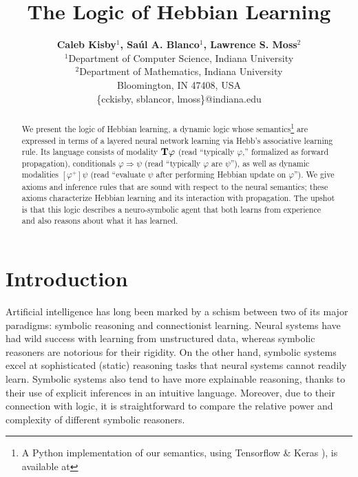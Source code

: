 \documentclass[letterpaper]{article}
\title{The Logic of Hebbian Learning}
\author{\textbf{Caleb Kisby$^1$, Sa\'{u}l A. Blanco$^1$, Lawrence S. Moss$^2$}\\
\normalsize $^1$Department of Computer Science, Indiana University\\ 
\normalsize $^2$Department of Mathematics, Indiana University\\
\normalsize Bloomington, IN 47408, USA\\
\normalsize \{cckisby, sblancor, lmoss\}@indiana.edu}
\date{}
\theoremstyle{definition}
\newcommand{\Typ}{\textrm{\textup{\textbf{T}}}}
\begin{document}
\maketitle

\vspace*{-2\baselineskip}
\setlength{\fboxrule}{0.8pt}
\setlength{\fboxsep}{1em}
\begin{center}
\end{center}
\vspace*{2\baselineskip}

\begin{abstract}
We present the logic of Hebbian learning, a dynamic logic whose semantics\footnote{A Python implementation of our semantics, using Tensorflow \& Keras \citep{tensorflow2015-whitepaper}), is available at
}
are expressed in terms of a layered neural network learning via Hebb's associative learning rule.  Its language consists of modality $\Typ \varphi$ (read ``typically $\varphi$,'' formalized as forward propagation), conditionals $\varphi \Rightarrow \psi$ (read ``typically $\varphi$ are $\psi$''), as well as dynamic modalities $[\varphi^+] \psi$ (read ``evaluate $\psi$ after performing Hebbian update on $\varphi$'').  We give axioms and inference rules that are sound with respect to the neural semantics; these axioms characterize Hebbian learning and its interaction with propagation.  The upshot is that this logic describes a neuro-symbolic agent that both learns from experience and also reasons about what it has learned.
\end{abstract}

\section{Introduction}

Artificial intelligence  has  long  been  marked  by  a  schism between two of its major paradigms: symbolic reasoning and connectionist learning.  Neural systems have had wild success with learning from unstructured data, whereas symbolic reasoners are notorious for their rigidity.  On the other hand, symbolic systems excel at sophisticated (static) reasoning tasks that neural systems cannot readily learn.  Symbolic systems also tend to have more explainable reasoning, thanks to their use of explicit inferences in an intuitive language.  Moreover, due to their connection with logic, it is straightforward to compare the relative power and complexity of different symbolic reasoners.
\end{document}
